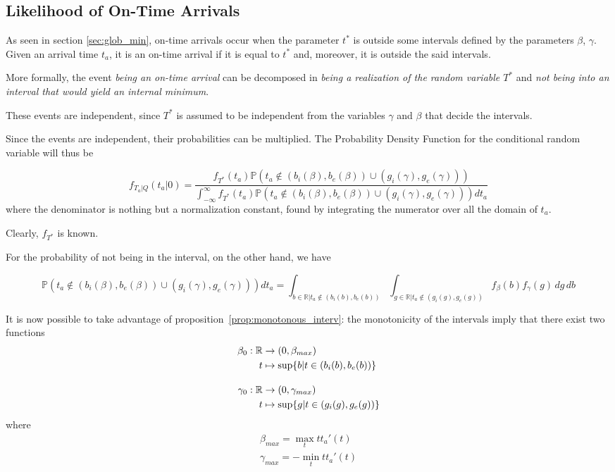 \subsection{Likelihood of On-Time Arrivals}
\label{sec:lik_ot}

As seen in section \ref{sec:glob_min},
on-time arrivals occur when the parameter \(t^*\) is outside some intervals defined by the parameters \(\beta\), \(\gamma\).
Given an arrival time \(t_a\),
it is an on-time arrival if it is equal to \(t^*\) and, moreover, it is outside the said intervals.

More formally, the event \textit{being an on-time arrival} can be decomposed in \textit{being a realization of the random variable \(T^*\)} and \textit{not being into an interval that would yield an internal minimum}.

These events are independent, since \(T^*\) is assumed to be independent from the variables \(\gamma\) and \(\beta\) that decide the intervals.

Since the events are independent, their probabilities can be multiplied.
The Probability Density Function for the conditional random variable will thus be

\begin{equation}
  \label{eq:pdf_ot}
    f_{T_a | Q}(t_a | 0) = \frac{f_{T^*}(t_a)\mathbb{P}( t_a \not\in (b_i(\beta), b_e(\beta)) \cup (g_i(\gamma), g_e(\gamma)))}{\int_{-\infty}^\infty f_{T^*}(t_a)\mathbb{P}( t_a \not\in (b_i(\beta), b_e(\beta)) \cup (g_i(\gamma), g_e(\gamma)))dt_a}
\end{equation}
where the denominator is nothing but a normalization constant, found by integrating the numerator over all the domain of \(t_a\).

Clearly, \(f_{T^*}\) is known.

For the probability of not being in the interval, on the other hand, we have 

\begin{equation}
  \label{eq:prob_not_interv}
  \mathbb{P}( t_a \not\in (b_i(\beta), b_e(\beta)) \cup (g_i(\gamma), g_e(\gamma)))dt_a = \int_{b\in \mathbb{R} \vert t_a \not\in (b_i(b), b_e(b))}\int_{g \in \mathbb{R} \vert t_a \not\in (g_i(g), g_e(g))}f_\beta(b)f_\gamma(g)\, dg\, db
\end{equation}

It is now possible to take advantage of proposition~\ref{prop:monotonous_interv}:
the monotonicity of the intervals imply that there exist two functions
\begin{equation}
  \label{eq:def_b_0_g_0}
  \begin{split}
    \beta_0:\mathbb{R}&\rightarrow(0, \beta_{max}) \\
    t&\mapsto \sup\{b | t \in (b_i(b), b_e(b))\} \\[1em]
    \gamma_0:\mathbb{R}&\rightarrow(0, \gamma_{max}) \\
    t&\mapsto \sup\{g | t \in (g_i(g), g_e(g))\}
  \end{split}
\end{equation}
where
\begin{align*}
  \beta_{max} = \max_t tt_a'(t) \\
  \gamma_{max} = -\min_t tt_a'(t)
\end{align*}

